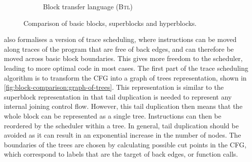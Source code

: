 \begin{figure}
\begin{subfigure}[b]{0.48\linewidth}
    \caption{Block transfer language (\textsc{Btl})}\label{fig:block-comparison:btl}
  \end{subfigure}
  \caption{Comparison of basic blocks, superblocks and hyperblocks.}%
  \label{fig:block-comparison}
\end{figure}

\textcite{tristan08_formal_verif_trans_valid} also formalises a version of trace
scheduling, where instructions can be moved along traces of the program that are
free of back edges, and can therefore be moved across basic block boundaries.
This gives more freedom to the scheduler, leading to more optimal code in most
cases.  The first part of the trace scheduling algorithm is to transform the
\gls{CFG} into a graph of trees representation, shown in
\cref{fig:block-comparison:graph-of-trees}.  This representation is similar to
the superblock representation in that tail duplication is needed to represent
any internal joining control flow.  However, this tail duplication then means
that the whole block can be represented as a single tree.  Instructions can then
be reordered by the scheduler within a tree.  In general, tail duplication
should be avoided as it can result in an exponential increase in the number of
nodes.  The boundaries of the trees are chosen by calculating possible cut
points in the \gls{CFG}, which correspond to labels that are the target of back
edges, or function calls.

